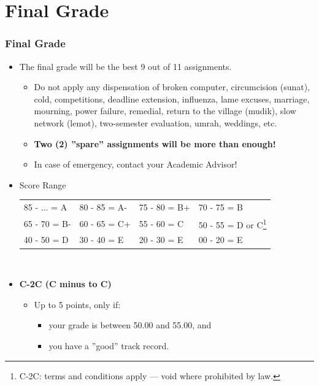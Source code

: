 \documentclass[aspectratio=169, xcolor=table, notheorems, hyperref={pdfpagelabels=false}]{beamer}
\begin{document}
\section{Final Grade}
\begin{frame}
\frametitle{Final Grade}

\begin{itemize}
\item The final grade will be the best 9 out of 11 assignments.
\begin{itemize}
\item Do not apply any dispensation of broken computer, circumcision (sunat), cold, competitions,
      deadline extension, influenza, lame excuses, marriage, mourning, power failure, remedial, return to 
      the village (mudik), slow network (lemot), two-semester evaluation, umrah, weddings, etc.
\item \textbf{Two (2) ''spare'' assignments will be more than enough!}
\item In case of emergency, contact your Academic Advisor!
\end{itemize}
\item Score Range\\[5pt]
\begin{tabular}{l l l l}
\hline
85 - ... = A & 80 - 85 = A- & 75 - 80 = B+ & 70 - 75 = B \\
65 - 70 = B-      & 60 - 65 = C+ & 55 - 60 = C  & 
50 - 55 = D or C\footnote{C-2C: terms and conditions apply --- void where prohibited by law.}  \\
40 - 50 = D  & 30 - 40 = E  & 20 - 30 = \small E & 00 - 20 = \tiny E   \\
\hline
\end{tabular}\\[5pt]
\item \textbf{C-2C (C minus to C)}
\begin{itemize}
\item Up to 5 points, only if:
\begin{itemize}
\item your grade is between 50.00 and 55.00, and
\item you have a ''good'' track record.
\end{itemize}
\end{itemize}
\end{itemize}

\end{frame}
\end{document}
